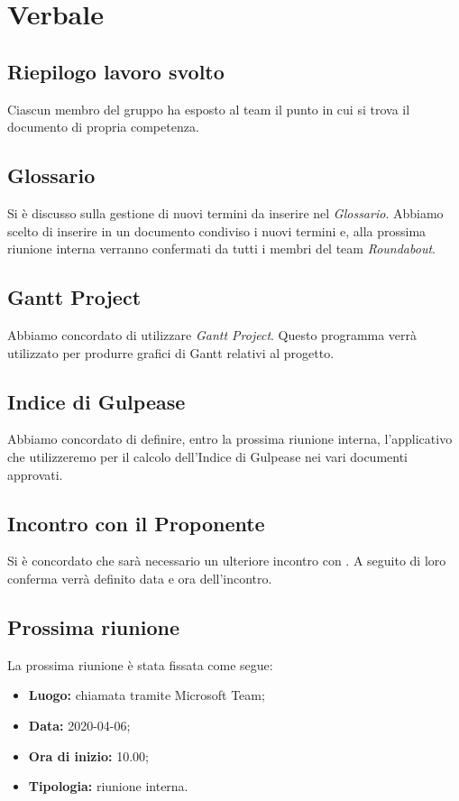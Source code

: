 \section{Verbale}
	
	\subsection{Riepilogo lavoro svolto}
		Ciascun membro del gruppo ha esposto al team il punto in cui si trova il documento di propria competenza.

	\subsection{Glossario}
		Si è discusso sulla gestione di nuovi termini da inserire nel \textit{Glossario}. Abbiamo scelto di inserire in un documento condiviso i nuovi termini e, alla prossima riunione interna verranno confermati da tutti i membri del team \textit{Roundabout}.

	\subsection{Gantt Project}
		Abbiamo concordato di utilizzare \textit{Gantt Project}. Questo programma verrà utilizzato per produrre grafici di Gantt relativi al progetto.
		
	\subsection{Indice di Gulpease}
		Abbiamo concordato di definire, entro la prossima riunione interna, l'applicativo che utilizzeremo per il calcolo dell'Indice di Gulpease nei vari documenti approvati.
		
	\subsection{Incontro con il Proponente}
		Si è concordato che sarà necessario un ulteriore incontro con \Proponente{}. A seguito di loro conferma verrà definito data e ora dell'incontro.

	\subsection{Prossima riunione}
		La prossima riunione è stata fissata come segue: 
		\begin{itemize}
			\item \textbf{Luogo: } chiamata tramite Microsoft Team; 
			\item \textbf{Data: } 2020-04-06; 
			\item \textbf{Ora di inizio: } 10.00;
			\item \textbf{Tipologia: } riunione interna.
		\end{itemize}
